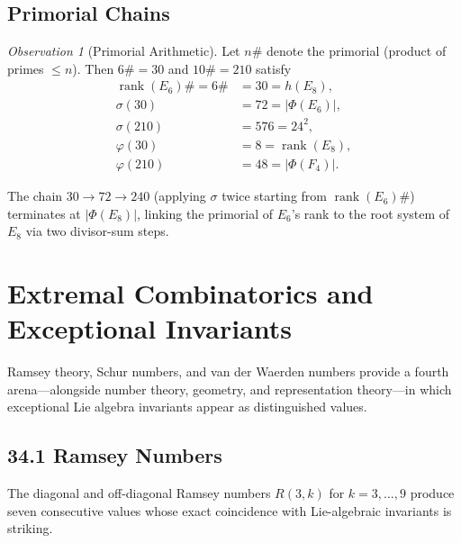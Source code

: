 \documentclass[11pt]{amsart}
\theoremstyle{plain}
\theoremstyle{definition}
\theoremstyle{remark}
\newtheorem{observation}[theorem]{Observation}
\renewcommand{\Phi}{\varPhi}
\begin{document}
\subsection{Primorial Chains}

\begin{observation}[Primorial Arithmetic]
\label{obs:primorial}
Let $n\#$ denote the primorial (product of primes $\leq n$).  Then
$6\#=30$ and $10\#=210$ satisfy
\begin{align}
  \operatorname{rank}(E_6)\# = 6\# &= 30 = h(E_8), \label{eq:rank-E6-primorial}\\
  \sigma(30) &= 72 = |\Phi(E_6)|, \label{eq:sigma-30}\\
  \sigma(210) &= 576 = 24^2, \label{eq:sigma-210}\\
  \varphi(30) &= 8 = \operatorname{rank}(E_8), \label{eq:phi-30}\\
  \varphi(210) &= 48 = |\Phi(F_4)|. \label{eq:phi-210}
\end{align}
\end{observation}

The chain $30 \to 72 \to 240$ (applying $\sigma$ twice starting from
$\operatorname{rank}(E_6)\#$) terminates at $|\Phi(E_8)|$, linking the
primorial of $E_6$'s rank to the root system of $E_8$ via two divisor-sum
steps.


\section{Extremal Combinatorics and Exceptional Invariants}%
\label{sec:extremal-combinatorics}

Ramsey theory, Schur numbers, and van der Waerden numbers provide a
fourth arena---alongside number theory, geometry, and representation
theory---in which exceptional Lie algebra invariants appear as
distinguished values.

\subsection*{34.1 Ramsey Numbers}

The diagonal and off-diagonal Ramsey numbers $R(3,k)$ for
$k=3,\dots,9$ produce seven consecutive values whose exact coincidence
with Lie-algebraic invariants is striking.
\end{document}
